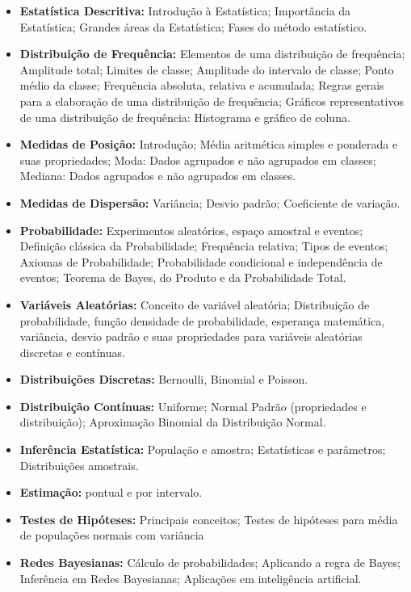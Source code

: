 \begin{itemize}
 \item \textbf{Estatística Descritiva:} Introdução à Estatística; Importância da Estatística; Grandes áreas da Estatística; Fases do método estatístico.
 \item \textbf{Distribuição de Frequência:} Elementos de uma distribuição de frequência; Amplitude total; Limites de classe; Amplitude do intervalo de classe; Ponto médio da classe; Frequência absoluta, relativa e acumulada; Regras gerais para a elaboração de uma distribuição de frequência; Gráficos representativos de uma distribuição de frequência: Histograma e gráfico de coluna.
 \item \textbf{Medidas de Posição:} Introdução; Média aritmética simples e ponderada e suas propriedades; Moda: Dados agrupados e não  agrupados em classes; Mediana: Dados agrupados e não agrupados em classes.
 \item \textbf{Medidas de Dispersão:} Variância; Desvio padrão; Coeficiente de variação.
 \item \textbf{Probabilidade:} Experimentos aleatórios, espaço amostral e eventos; Definição clássica da Probabilidade; Frequência relativa; Tipos de eventos; Axiomas de Probabilidade; Probabilidade condicional e independência de eventos; Teorema de Bayes, do Produto e da Probabilidade Total.
 \item \textbf{Variáveis Aleatórias:} Conceito de variável aleatória; Distribuição de probabilidade, função densidade de probabilidade, esperança matemática, variância, desvio padrão e suas propriedades para variáveis aleatórias discretas e contínuas.
 \item \textbf{Distribuições Discretas:} Bernoulli, Binomial e Poisson.
 \item \textbf{Distribuição Contínuas:} Uniforme; Normal Padrão (propriedades e distribuição); Aproximação Binomial da Distribuição Normal.
 \item \textbf{Inferência Estatística:} População e amostra; Estatísticas e parâmetros; Distribuições amostrais.
 \item \textbf{Estimação:} pontual e por intervalo.
 \item \textbf{Testes de Hipóteses:} Principais conceitos; Testes de hipóteses para média de populações normais com variância 
 \item \textbf{Redes Bayesianas:} Cálculo de probabilidades; Aplicando a regra de Bayes; Inferência em Redes Bayesianas; Aplicações em inteligência artificial.
 \end{itemize}
